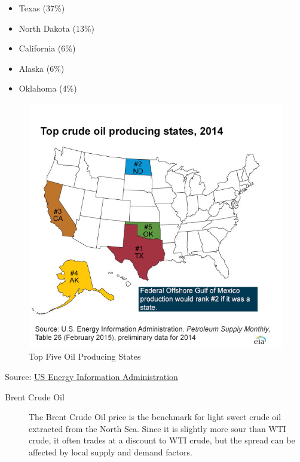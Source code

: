 \documentclass[]{book}
\providecommand{\tightlist}{%
  \setlength{\itemsep}{0pt}\setlength{\parskip}{0pt}}
\theoremstyle{definition}
\theoremstyle{definition}
\theoremstyle{remark}
\begin{document}
\begin{itemize}
\tightlist
\item
  Texas (37\%)
\item
  North Dakota (13\%)
\item
  California (6\%)
\item
  Alaska (6\%)
\item
  Oklahoma (4\%)
\end{itemize}

\begin{figure}[htbp]
\centering
\includegraphics{images/top_5_petroleum_states-large.jpg}
\caption{Top Five Oil Producing States}
\end{figure}

Source:
\href{http://www.eia.gov/Energyexplained/index.cfm?page=oil_home}{US
Energy Information Administration}

\begin{description}
\item[Brent Crude Oil]
The Brent Crude Oil price is the benchmark for light sweet crude oil
extracted from the North Sea. Since it is slightly more sour than WTI
crude, it often trades at a discount to WTI crude, but the spread can be
affected by local supply and demand factors.
\end{description}
\end{document}
